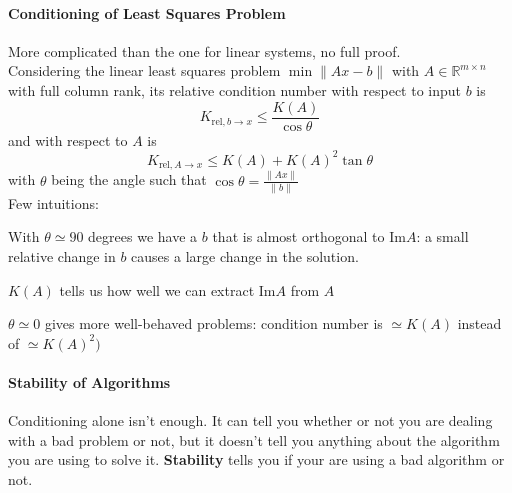 \documentclass[10pt]{report}
\begin{document}
\paragraph{Conditioning of Least Squares Problem} More complicated than the one for linear systems, no full proof.\\
Considering the linear least squares problem $\min\|Ax-b\|$ with $A\in\mathbb{R}^{m\times n}$ with full column rank, its relative condition number with respect to input $b$ is $$K_{\text{rel}, b\to x}\leq\frac{K(A)}{\cos\theta}$$ and with respect to $A$ is $$K_{\text{rel}, A\to x}\leq K(A)+K(A)^2\tan\theta$$ with $\theta$ being the angle such that $\cos\theta=\frac{\|Ax\|}{\|b\|}$\\
Few intuitions:\begin{list}{}{}
	\item With $\theta\simeq 90$ degrees we have a $b$ that is almost orthogonal to $\text{Im}A$: a small relative change in $b$ causes a large change in the solution.
	\item $K(A)$ tells us how well we can extract $\text{Im}A$ from $A$
	\item $\theta\simeq 0$ gives more well-behaved problems: condition number is $\simeq K(A)$ instead of $\simeq K(A)^2)$
\end{list}
\paragraph{Stability of Algorithms} Conditioning alone isn't enough. It can tell you whether or not you are dealing with a bad problem or not, but it doesn't tell you anything about the algorithm you are using to solve it. \textbf{Stability} tells you if your are using a bad algorithm or not.
\end{document}
